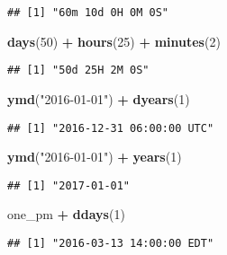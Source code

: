 \documentclass[
]{article}
\newenvironment{Shaded}{\begin{snugshade}}{\end{snugshade}}
\newcommand{\DecValTok}[1]{\textcolor[rgb]{0.00,0.00,0.81}{#1}}
\newcommand{\FunctionTok}[1]{\textcolor[rgb]{0.13,0.29,0.53}{\textbf{#1}}}
\newcommand{\NormalTok}[1]{#1}
\newcommand{\SpecialCharTok}[1]{\textcolor[rgb]{0.81,0.36,0.00}{\textbf{#1}}}
\newcommand{\StringTok}[1]{\textcolor[rgb]{0.31,0.60,0.02}{#1}}
\begin{document}
\begin{verbatim}
## [1] "60m 10d 0H 0M 0S"
\end{verbatim}

\begin{Shaded}
\begin{Highlighting}[]
\FunctionTok{days}\NormalTok{(}\DecValTok{50}\NormalTok{) }\SpecialCharTok{+} \FunctionTok{hours}\NormalTok{(}\DecValTok{25}\NormalTok{) }\SpecialCharTok{+} \FunctionTok{minutes}\NormalTok{(}\DecValTok{2}\NormalTok{)}
\end{Highlighting}
\end{Shaded}

\begin{verbatim}
## [1] "50d 25H 2M 0S"
\end{verbatim}

\begin{Shaded}
\begin{Highlighting}[]
\FunctionTok{ymd}\NormalTok{(}\StringTok{"2016{-}01{-}01"}\NormalTok{) }\SpecialCharTok{+} \FunctionTok{dyears}\NormalTok{(}\DecValTok{1}\NormalTok{)}
\end{Highlighting}
\end{Shaded}

\begin{verbatim}
## [1] "2016-12-31 06:00:00 UTC"
\end{verbatim}

\begin{Shaded}
\begin{Highlighting}[]
\FunctionTok{ymd}\NormalTok{(}\StringTok{"2016{-}01{-}01"}\NormalTok{) }\SpecialCharTok{+} \FunctionTok{years}\NormalTok{(}\DecValTok{1}\NormalTok{)}
\end{Highlighting}
\end{Shaded}

\begin{verbatim}
## [1] "2017-01-01"
\end{verbatim}

\begin{Shaded}
\begin{Highlighting}[]
\NormalTok{one\_pm }\SpecialCharTok{+} \FunctionTok{ddays}\NormalTok{(}\DecValTok{1}\NormalTok{)}
\end{Highlighting}
\end{Shaded}

\begin{verbatim}
## [1] "2016-03-13 14:00:00 EDT"
\end{verbatim}
\end{document}
